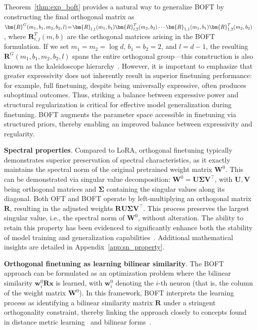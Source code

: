 Theorem~\ref{thm:exp_boft} provides a natural way to generalize BOFT by constructing the final orthogonal matrix as $\thickmuskip=2mu \medmuskip=2mu \bm{R}^G(m_1,b_1,m_2,b_2,l)=\bm{R}_{l,1}(m_1,b_1)\bm{R}_{l,2}^T(m_2,b_2)\cdots\bm{R}_{1,1}(m_1,b_1)\bm{R}_{1,2}^T(m_2,b_2)$, where $\bm{R}_{i,j}^T(m,b)$ are the orthogonal matrices arising in the BOFT formulation. If we set $m_1=m_2=\log d$, $b_1=b_2=2$, and $l=d-1$, the resulting $\bm{R}^G(m_1,b_1,m_2,b_2,l)$ spans the entire orthogonal group—this construction is also known as the kaleidoscope hierarchy~\cite{dao2019kaleidoscope}. However, it is important to emphasize that greater expressivity does not inherently result in superior finetuning performance: for example, full finetuning, despite being universally expressive, often produces suboptimal outcomes. Thus, striking a balance between expressive power and structural regularization is critical for effective model generalization during finetuning. BOFT augments the parameter space accessible in finetuning via structured priors, thereby enabling an improved balance between expressivity and regularity.

\textbf{Spectral properties}. Compared to LoRA, orthogonal finetuning typically demonstrates superior preservation of spectral characteristics, as it exactly maintains the spectral norm of the original pretrained weight matrix $\bm{W}^0$. This can be demonstrated via singular value decomposition: $\bm{W}^0=\bm{U}\bm{\Sigma}\bm{V}^\top$, with $\bm{U},\bm{V}$ being orthogonal matrices and $\bm{\Sigma}$ containing the singular values along its diagonal. Both OFT and BOFT operate by left-multiplying an orthogonal matrix $\bm{R}$, resulting in the adjusted weights $\bm{R}\bm{U}\bm{\Sigma}\bm{V}^\top$. This process preserves the largest singular value, i.e., the spectral norm of $\bm{W}^0$, without alteration. The ability to retain this property has been evidenced to significantly enhance both the stability of model training and generalization capabilities~\cite{miyato2018spectral,yoshida2017spectral}. Additional mathematical insights are detailed in Appendix~\ref{app:sn_property}.

\textbf{Orthogonal finetuning as learning bilinear similarity}. The BOFT approach can be formulated as an optimization problem where the bilinear similarity $\bm{w}^0_i\bm{R}\bm{x}$ is learned, with $\bm{w}^0_i$ denoting the $i$-th neuron (that is, the column of the weight matrix $\bm{W}^0$). In this framework, BOFT interprets the learning process as identifying a bilinear similarity matrix $\bm{R}$ under a stringent orthogonality constraint, thereby linking the approach closely to concepts found in distance metric learning~\cite{xing2002distance} and bilinear forms~\cite{roman2005advanced}.

